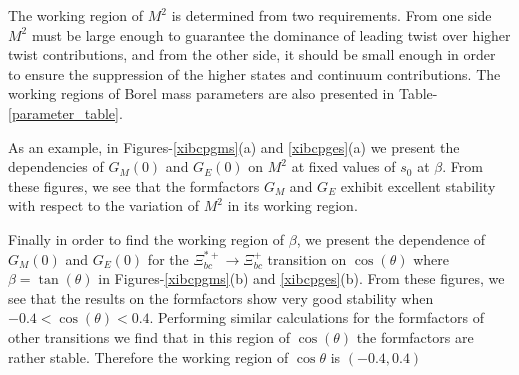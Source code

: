The working region of $M^2$ is determined from two requirements. From one side $M^2$ must be large enough to guarantee the dominance of leading twist over higher twist contributions, and from the other side, it should be small enough in order to ensure the suppression of the higher states and continuum contributions. The working regions of Borel mass parameters are also presented in Table-\ref{parameter_table}.

As an example, in Figures-\ref{xibcpgms}(a) and \ref{xibcpges}(a) we present the dependencies of $G_M(0)$ and $G_E(0)$ on $M^2$ at fixed values of $s_0$ at $\beta$. From these figures, we see that the formfactors $G_M$ and $G_E$ exhibit excellent stability with respect to the variation of $M^2$ in its working region.

\tikzexternalenable


Finally in order to find the working region of $\beta$, we present the dependence of $G_M(0)$ and $G_E(0)$ for the $\Xi_{bc}^{\ast+}\rightarrow\Xi_{bc}^{+}$ transition on $\cos(\theta)$ where $\beta=\tan(\theta)$ in Figures-\ref{xibcpgms}(b) and \ref{xibcpges}(b). From these figures, we see that the results on the formfactors show very good stability when $-0.4<\cos(\theta)<0.4$. Performing similar calculations for the formfactors of other transitions we find that in this region of $\cos(\theta)$ the formfactors are rather stable. Therefore the working region of $\cos\theta$ is $\left(-0.4,0.4\right)$

